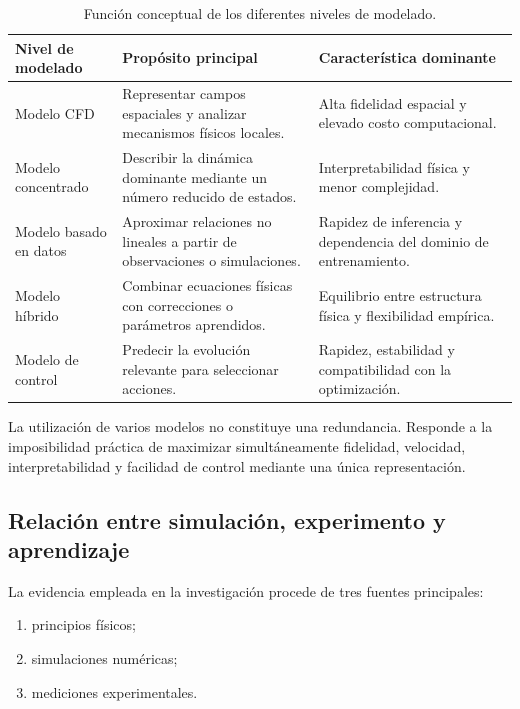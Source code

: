 \begin{table}[H]
\centering
\caption{Función conceptual de los diferentes niveles de modelado.}
\label{tab:jerarquia_conceptual_modelos}
\renewcommand{\arraystretch}{1.35}
\begin{tabular}{
p{}
p{}
p{}
}
\toprule
\textbf{Nivel de modelado}
&
\textbf{Propósito principal}
&
\textbf{Característica dominante}
\\
\midrule

Modelo CFD
&
Representar campos espaciales y analizar mecanismos físicos locales.
&
Alta fidelidad espacial y elevado costo computacional.
\\

Modelo concentrado
&
Describir la dinámica dominante mediante un número reducido de estados.
&
Interpretabilidad física y menor complejidad.
\\

Modelo basado en datos
&
Aproximar relaciones no lineales a partir de observaciones o simulaciones.
&
Rapidez de inferencia y dependencia del dominio de entrenamiento.
\\

Modelo híbrido
&
Combinar ecuaciones físicas con correcciones o parámetros aprendidos.
&
Equilibrio entre estructura física y flexibilidad empírica.
\\

Modelo de control
&
Predecir la evolución relevante para seleccionar acciones.
&
Rapidez, estabilidad y compatibilidad con la optimización.
\\
\bottomrule
\end{tabular}
\end{table}

La utilización de varios modelos no constituye una redundancia. Responde a la imposibilidad práctica de maximizar simultáneamente fidelidad, velocidad, interpretabilidad y facilidad de control mediante una única representación.

\subsection{Relación entre simulación, experimento y aprendizaje}
\label{subsec:simulacion_experimento_aprendizaje}

La evidencia empleada en la investigación procede de tres fuentes principales:

\begin{enumerate}
    \item principios físicos;
    \item simulaciones numéricas;
    \item mediciones experimentales.
\end{enumerate}


